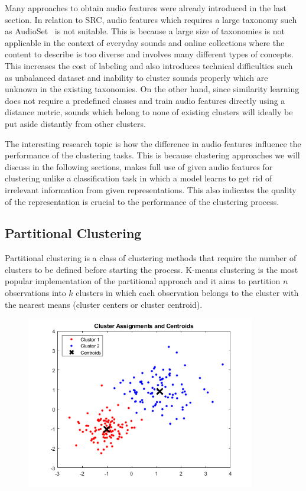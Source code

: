 Many approaches to obtain audio features were already introduced in the last section. In relation to SRC, audio features which requires a large taxonomy such as AudioSet~\cite{jort2017} is not suitable. This is because a large size of taxonomies is not applicable in the context of everyday sounds and online collections where the content to describe is too diverse and involves many different types of concepts. This increases the cost of labeling and also introduces technical difficulties such as unbalanced dataset and inability to cluster sounds properly which are unknown in the existing taxonomies. On the other hand, since similarity learning does not require a predefined classes and train audio features directly using a distance metric, sounds which belong to none of existing clusters will ideally be put aside distantly from other clusters.

 The interesting research topic is how the difference in audio features influence the performance of the clustering tasks. This is because clustering approaches we will discuss in the following sections, makes full use of given audio features for clustering unlike a classification task in which a model learns to get rid of irrelevant information from given representations. This also indicates the quality of the representation is crucial to the performance of the clustering process. %
 
 
\subsection{Partitional Clustering}
Partitional clustering is a class of clustering methods that require the number of clusters to be defined before starting the process. K-means clustering is the most popular implementation of the partitional approach and it aims to partition $n$ observations into $k$ clusters in which each observation belongs to the cluster with the nearest means (cluster centers or cluster centroid).

\begin{figure}[htb]
	\centering
	\includegraphics[width=10cm]{Figures/kmeans_diagram.png}
	\caption{}
	\label{kmeans-diagram}
\end{figure}

